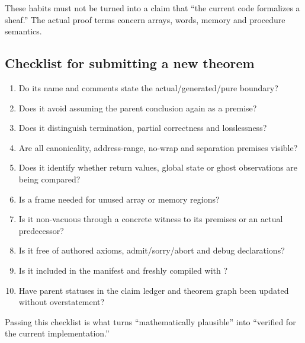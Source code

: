 These habits must not be turned into a claim that ``the current code formalizes
a sheaf.'' The actual proof terms concern arrays, words, memory and procedure
semantics.

\subsection{Checklist for submitting a new theorem}

\begin{enumerate}
  \item Do its name and comments state the actual/generated/pure boundary?
  \item Does it avoid assuming the parent conclusion again as a premise?
  \item Does it distinguish termination, partial correctness and losslessness?
  \item Are all canonicality, address-range, no-wrap and separation premises visible?
  \item Does it identify whether return values, global state or ghost observations
        are being compared?
  \item Is a frame needed for unused array or memory regions?
  \item Is it non-vacuous through a concrete witness to its premises or an actual
        predecessor?
  \item Is it free of authored axioms, admit/sorry/abort and debug declarations?
  \item Is it included in the manifest and freshly compiled with ?
  \item Have parent statuses in the claim ledger and theorem graph been updated
        without overstatement?
\end{enumerate}

Passing this checklist is what turns ``mathematically plausible'' into
``verified for the current implementation.''

